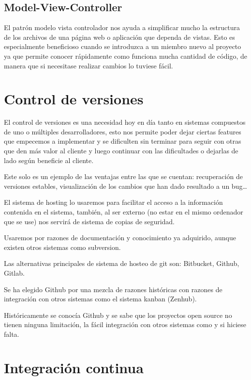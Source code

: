 \subsection{Model-View-Controller}

El patrón modelo vista controlador nos ayuda a simplificar mucho la estructura de los archivos de una página web o aplicación que dependa de vistas. Esto es especialmente beneficioso cuando se introduzca a un miembro nuevo al proyecto ya que permite conocer rápidamente como funciona mucha cantidad de código, de manera que si necesitase realizar cambios lo tuviese fácil.


\section{Control de versiones}

El control de versiones es una necesidad hoy en día tanto en sistemas compuestos de uno o múltiples desarrolladores, esto nos permite poder dejar ciertas features que empecemos a implementar y se dificulten sin terminar para seguir con otras que den más valor al cliente y luego continuar con las dificultades o dejarlas de lado según beneficie al cliente.

Este solo es un ejemplo de las ventajas entre las que se cuentan: recuperación de versiones estables, visualización de los cambios que han dado resultado a un bug\ldots

El sistema de hosting lo usaremos para facilitar el acceso a la información contenida en el sistema, también, al ser externo (no estar en el mismo ordenador que se use) nos servirá de sistema de copias de seguridad.

Usaremos  por razones de documentación y conocimiento ya adquirido, aunque existen otros sistemas como subversion.

Las alternativas principales de sistema de hosteo de git son: Bitbucket, Github, Gitlab.

Se ha elegido Github por una mezcla de razones históricas con razones de integración con otros sistemas como el sistema kanban (Zenhub).

Históricamente se conocía Github y se sabe que los proyectos open source no tienen ninguna limitación, la fácil integración con otros sistemas como  y  si hiciese falta.


\section{Integración continua}

